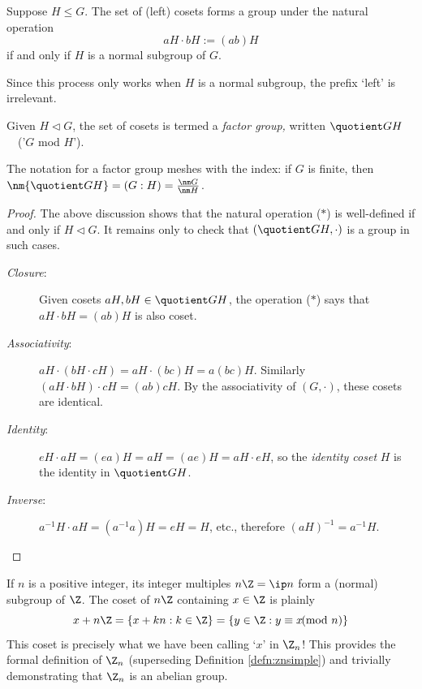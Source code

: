 \begin{thm}{}{}
	Suppose $H\le G$. The set of (left) cosets forms a group under the natural operation
	\[
		aH\cdot bH:=(ab)H \tag{$\ast$}
	\]
	if and only if $H$ is a normal subgroup of $G$.
\end{thm}

Since this process only works when $H$ is a normal subgroup, the prefix `left' is irrelevant.

\begin{defn}{}{}
	Given $H\triangleleft G$, the set of cosets is termed a \emph{factor group,} written $\quotient GH$ \ \ ('$G$ mod $H$').
\end{defn}

The notation for a factor group meshes with the index: if $G$ is finite, then $\nm{\quotient GH}=(G:H)=\frac{\nm G}{\nm H}$.


\begin{proof}
	The above discussion shows that the natural operation ($\ast$) is well-defined if and only if $H\triangleleft G$. It remains only to check that $\left(\quotient GH,\cdot\right)$ is a group in such cases.
	\begin{description}
		\item[\normalfont\emph{Closure}:] Given cosets $aH,bH\in\quotient GH$,  the operation ($\ast$) says that $aH\cdot bH=(ab)H$ is also coset.
		\item[\normalfont\emph{Associativity}:] $aH\cdot(bH\cdot cH)=aH\cdot(bc)H=a(bc)H$. Similarly $(aH\cdot bH)\cdot cH=(ab)cH$. By the associativity of $(G,\cdot)$, these cosets are identical.
		\item[\normalfont\emph{Identity}:] $eH\cdot aH=(ea)H=aH=(ae)H=aH\cdot eH$, so the \emph{identity coset} $H$ is the identity in $\quotient GH$.
		\item[\normalfont\emph{Inverse}:] $a^{-1}H\cdot aH=(a^{-1}a)H=eH=H$, etc., therefore $(aH)^{-1}=a^{-1}H$.\qedhere
	\end{description}
\end{proof}

\fi
\goodbreak



If $n$ is a positive integer, its integer multiples $n\Z=\ip n$ form a (normal) subgroup of $\Z$. The coset of $n\Z$ containing $x\in\Z$ is plainly
\[
	x+n\Z=\{x+kn:k\in\Z\}
	=\{y\in\Z:y\equiv x\negthickspace\negthickspace\pmod n\}
\]
This coset is precisely what we have been calling `$x$' in $\Z_n$! This provides the formal definition of $\Z_n$ (superseding Definition \ref{defn:znsimple}) and trivially demonstrating that $\Z_n$ is an abelian group.

